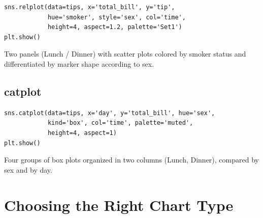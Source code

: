 \begin{codeblock}[title=\textbf{Python}]
\begin{verbatim}
sns.relplot(data=tips, x='total_bill', y='tip',
            hue='smoker', style='sex', col='time',
            height=4, aspect=1.2, palette='Set1')
plt.show()
\end{verbatim}
\end{codeblock}

\begin{codeoutput}
Two panels (Lunch / Dinner) with scatter plots colored by smoker status and differentiated by marker shape according to sex.
\end{codeoutput}

\subsection{catplot}

\begin{codeblock}[title=\textbf{Python}]
\begin{verbatim}
sns.catplot(data=tips, x='day', y='total_bill', hue='sex',
            kind='box', col='time', palette='muted',
            height=4, aspect=1)
plt.show()
\end{verbatim}
\end{codeblock}

\begin{codeoutput}
Four groups of box plots organized in two columns (Lunch, Dinner), compared by sex and by day.
\end{codeoutput}

\section{Choosing the Right Chart Type}

